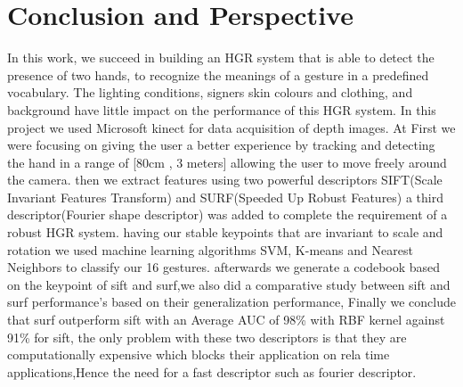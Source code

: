\chapter*{Conclusion and Perspective}

In this work, we succeed in building an HGR system that is able to detect the presence of two hands, to recognize the meanings of a gesture  in a predefined vocabulary. The lighting conditions, signers skin colours and clothing, and background  have little impact on the performance of this HGR system. 
In this project we used Microsoft kinect for data acquisition of depth images. At  First we were focusing on giving the user a better experience by tracking and  detecting the hand  in a range of [80cm , 3 meters]  allowing the  user to move freely around the camera. then we extract features using two powerful descriptors SIFT(Scale Invariant Features Transform) and SURF(Speeded Up Robust Features) a  third descriptor(Fourier shape descriptor)  was added to complete the requirement of a robust HGR system. having our stable keypoints that are invariant to scale and rotation  we used machine learning algorithms SVM, K-means and Nearest Neighbors  to classify our  16 gestures. afterwards we generate a codebook based on the keypoint of sift and surf,we also did  a comparative study between sift and surf performance's based on their generalization performance, Finally we conclude that surf outperform sift with an Average AUC of 98\% with RBF kernel against 91\% for sift, the only problem with these two descriptors is that they are computationally expensive which blocks their application on rela time applications,Hence the need for a fast descriptor such as fourier descriptor.

